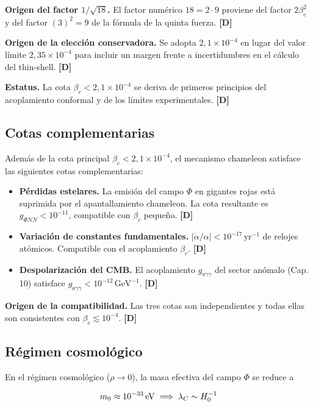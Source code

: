 ﻿\documentclass[11pt,letterpaper]{article}
\begin{document}
\textbf{Origen del factor $1/\sqrt{18}$.} El factor numérico $18 = 2 \cdot 9$ proviene del factor $2\beta_c^2$ y del factor $(3)^2 = 9$ de la fórmula de la quinta fuerza. \textbf{[D]}

\textbf{Origen de la elección conservadora.} Se adopta $2{,}1 \times 10^{-4}$ en lugar del valor límite $2{,}35 \times 10^{-4}$ para incluir un margen frente a incertidumbres en el cálculo del thin-shell. \textbf{[D]}

\textbf{Estatus.} La cota $\beta_c < 2{,}1 \times 10^{-4}$ se deriva de primeros principios del acoplamiento conformal y de los límites experimentales. \textbf{[D]}
\subsection{Cotas complementarias}
Además de la cota principal $\beta_c < 2{,}1 \times 10^{-4}$, el mecanismo chameleon satisface las siguientes cotas complementarias:

\begin{itemize}[leftmargin=*]
\item \textbf{Pérdidas estelares.} La emisión del campo $\Phi$ en gigantes rojas está suprimida por el apantallamiento chameleon. La cota resultante es $g_{\Phi NN} < 10^{-11}$, compatible con $\beta_c$ pequeño. \textbf{[D]}
\item \textbf{Variación de constantes fundamentales.} $|\dot\alpha/\alpha| < 10^{-17}\,\text{yr}^{-1}$ de relojes atómicos. Compatible con el acoplamiento $\beta_c$. \textbf{[D]}
\item \textbf{Despolarización del CMB.} El acoplamiento $g_{a\gamma\gamma}$ del sector anómalo (Cap. 10) satisface $g_{a\gamma\gamma} < 10^{-12}\,\text{GeV}^{-1}$. \textbf{[D]}
\end{itemize}

\textbf{Origen de la compatibilidad.} Las tres cotas son independientes y todas ellas son consistentes con $\beta_c \lesssim 10^{-4}$. \textbf{[D]}
\subsection{Régimen cosmológico}
En el régimen cosmológico ($\rho \to 0$), la masa efectiva del campo $\Phi$ se reduce a

\begin{equation*}
  \resizebox{\ifdim\width>\linewidth \linewidth\else\width\fi}{!}{$\displaystyle m_0 \approx 10^{-33}\,\text{eV} \implies \lambda_C \sim H_0^{-1}$}
\end{equation*}
\end{document}
